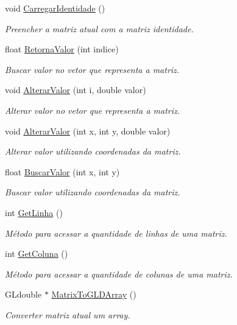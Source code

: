 \begin{DoxyCompactItemize}
void \hyperlink{class_matriz_a6d6e584c24c8c842054e5f1b163da4a8}{Carregar\+Identidade} ()
\begin{DoxyCompactList}\small\item\em Preencher a matriz atual com a matriz identidade. \end{DoxyCompactList}\item 
float \hyperlink{class_matriz_a1b1d243308d2abe0c4a006290080d1ca}{Retorna\+Valor} (int indice)
\begin{DoxyCompactList}\small\item\em Buscar valor no vetor que representa a matriz. \end{DoxyCompactList}\item 
void \hyperlink{class_matriz_a8c314e508d6c1e914934d5f1ef2de1ef}{Alterar\+Valor} (int i, double valor)
\begin{DoxyCompactList}\small\item\em Alterar valor no vetor que representa a matriz. \end{DoxyCompactList}\item 
void \hyperlink{class_matriz_a8f69fad47da1df40be3f448395c718cf}{Alterar\+Valor} (int x, int y, double valor)
\begin{DoxyCompactList}\small\item\em Alterar valor utilizando coordenadas da matriz. \end{DoxyCompactList}\item 
float \hyperlink{class_matriz_aee54b8e25924456f4edc7bf10146d877}{Buscar\+Valor} (int x, int y)
\begin{DoxyCompactList}\small\item\em Buscar valor utilizando coordenadas da matriz. \end{DoxyCompactList}\item 
int \hyperlink{class_matriz_a7e9924501f170446e0142a1fccf991a8}{Get\+Linha} ()
\begin{DoxyCompactList}\small\item\em Método para acessar a quantidade de linhas de uma matriz. \end{DoxyCompactList}\item 
int \hyperlink{class_matriz_acb08d38a62492a116456d5d2a14c7b04}{Get\+Coluna} ()
\begin{DoxyCompactList}\small\item\em Método para acessar a quantidade de colunas de uma matriz. \end{DoxyCompactList}\item 
G\+Ldouble $\ast$ \hyperlink{class_matriz_aad5c44bfa49cbe5221cee329a37303f9}{Matrix\+To\+G\+L\+D\+Array} ()
\begin{DoxyCompactList}\small\item\em Converter matriz atual um array. \end{DoxyCompactList}\end{DoxyCompactItemize}
